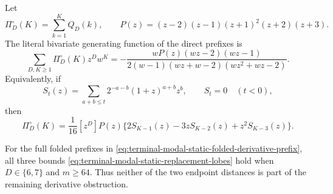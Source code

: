 \begin{lemma}
\label{lem:terminal-modal-static-derivative-prefix-gf}
Let
\[
 \Pi_D^\circ(K)=\sum_{k=1}^KQ_D(k),
 \qquad
 P(z)=(z-2)(z-1)(z+1)^2(z+2)(z+3).
\]
The literal bivariate generating function of the direct prefixes is
\begin{equation}
 \sum_{D,K\ge1}\Pi_D^\circ(K)z^Dw^K
 =-\frac{wP(z)(wz-2)(wz-1)}
 {2(w-1)(wz+w-2)(wz^2+wz-2)}.
 \label{eq:terminal-modal-static-direct-prefix-gf}
\end{equation}
Equivalently, if
\[
 S_t(z)=\sum_{a+b\le t}2^{-a-b}(1+z)^{a+b}z^b,
 \qquad S_t=0\quad(t<0),
\]
then
\begin{equation}
 \Pi_D^\circ(K)=\frac1{16}[z^D]P(z)
 \{2S_{K-1}(z)-3zS_{K-2}(z)+z^2S_{K-3}(z)\}.
 \label{eq:terminal-modal-static-direct-prefix-coefficient}
\end{equation}

For the full folded prefixes in
\eqref{eq:terminal-modal-static-folded-derivative-prefix}, all three bounds
\eqref{eq:terminal-modal-static-replacement-lobes} hold when
$D\in\{6,7\}$ and $m\ge64$.  Thus neither of the two endpoint distances is
part of the remaining derivative obstruction.
\end{lemma}

